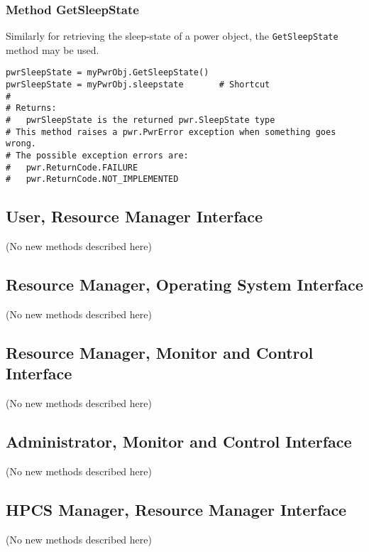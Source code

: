 \documentclass[12pt]{report} %
\begin{document}
\begin{appendices}
\subsubsection{Method GetSleepState} \label{meth:GetSleepState}

Similarly for retrieving the sleep-state of a power object, the \texttt{GetSleepState} method may be used.
\begin{center}\begin{minipage}{.95\linewidth}\begin{lstlisting}
pwrSleepState = myPwrObj.GetSleepState()
pwrSleepState = myPwrObj.sleepstate       # Shortcut
#
# Returns:
#   pwrSleepState is the returned pwr.SleepState type
# This method raises a pwr.PwrError exception when something goes wrong.
# The possible exception errors are: 
#   pwr.ReturnCode.FAILURE
#   pwr.ReturnCode.NOT_IMPLEMENTED
\end{lstlisting}\end{minipage}\end{center}

\subsection{User, Resource Manager
Interface}\label{sec:PythonUserResourceManagerInterface}
(No new methods described here)

\subsection{Resource Manager, Operating System
Interface}\label{sec:PythonResourceManagerOSInterface}
(No new methods described here)

\subsection{Resource Manager, Monitor and Control
Interface}\label{sec:PythonResourceManagerMonitorControlInterface}
(No new methods described here)

\subsection{Administrator, Monitor and Control
Interface}\label{sec:PythonAdministratorMonitorControlInterface}
(No new methods described here)

\subsection{HPCS Manager, Resource Manager
Interface}\label{sec:PythonHPCSManagerInterface}
(No new methods described here)


\end{appendices}
\end{document}
